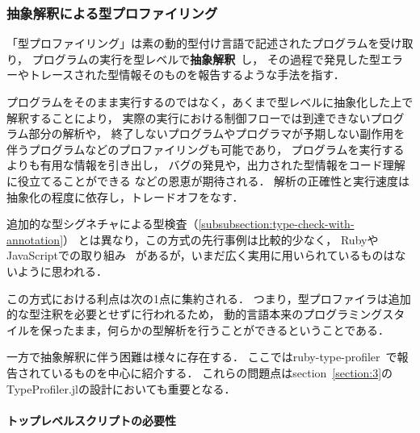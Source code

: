 \subsubsection{抽象解釈による型プロファイリング} \label{subsubsection:type-profiling}

「型プロファイリング」は素の動的型付け言語で記述されたプログラムを受け取り，
プログラムの実行を型レベルで\textbf{抽象解釈}~\cite{abstract-interpretation, scheme-for-automatic-inference}し，
その過程で発見した型エラーやトレースされた型情報そのものを報告するような手法を指す．

プログラムをそのまま実行するのではなく，あくまで型レベルに抽象化した上で解釈することにより，
実際の実行における制御フローでは到達できないプログラム部分の解析や，
終了しないプログラムやプログラマが予期しない副作用を伴うプログラムなどのプロファイリングも可能であり，
プログラムを実行するよりも有用な情報を引き出し，
バグの発見や，出力された型情報をコード理解に役立てることができる
などの恩恵が期待される\footnotemark[\value{footnote}]．
解析の正確性と実行速度は抽象化の程度に依存し，トレードオフをなす．


追加的な型シグネチャによる型検査（\ref{subsubsection:type-check-with-annotation}）
とは異なり，この方式の先行事例は比較的少なく，
RubyやJavaScriptでの取り組み~\cite{ruby-type-profiler, type-analysis-for-javascript, type-inference-for-javascript}
があるが，いまだ広く実用に用いられているものはないように思われる．\

この方式における利点は次の1点に集約される．
つまり，型プロファイラは追加的な型注釈を必要とせずに行われるため，
動的言語本来のプログラミングスタイルを保ったまま，何らかの型解析を行うことができるということである．

一方で抽象解釈に伴う困難は様々に存在する．
ここではruby-type-profiler~\cite{ruby-progress-report, ruby-type-profiler}で報告されているものを中心に紹介する．
これらの問題点はsection~\ref{section:3}のTypeProfiler.jlの設計においても重要となる．

\paragraph{トップレベルスクリプトの必要性}

